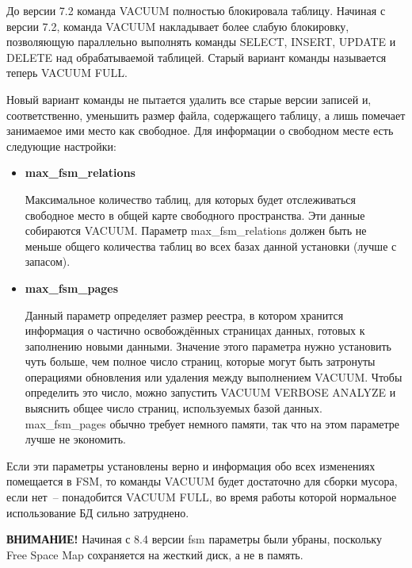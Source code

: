 До версии 7.2 команда VACUUM полностью блокировала таблицу. Начиная с версии 7.2, команда VACUUM накладывает более слабую
блокировку, позволяющую параллельно выполнять команды SELECT, INSERT, UPDATE и DELETE над обрабатываемой таблицей.
Старый вариант команды называется теперь VACUUM FULL.

Новый вариант команды не пытается удалить все старые версии записей и, соответственно, уменьшить размер файла, содержащего таблицу,
а лишь помечает занимаемое ими место как свободное. Для информации о свободном месте есть следующие настройки:
\begin{itemize}
\item \textbf{max\_fsm\_relations}

Максимальное количество таблиц, для которых будет отслеживаться свободное место в общей карте свободного пространства.
Эти данные собираются VACUUM. Параметр max\_fsm\_relations должен быть не меньше общего количества таблиц во всех
базах данной установки (лучше с запасом).

\item \textbf{max\_fsm\_pages}

Данный параметр определяет размер реестра, в котором хранится информация о частично освобождённых страницах данных,
готовых к заполнению новыми данными. Значение этого параметра нужно установить чуть больше, чем полное число страниц,
которые могут быть затронуты
операциями обновления или удаления между выполнением VACUUM. Чтобы определить это число, можно запустить VACUUM VERBOSE ANALYZE
и выяснить общее число страниц, используемых базой данных. max\_fsm\_pages обычно требует немного памяти, так что на этом
параметре лучше не экономить.
\end{itemize}

Если эти параметры установлены верно и информация обо всех изменениях помещается в FSM,
то команды VACUUM будет достаточно для сборки мусора, если нет~-- понадобится
VACUUM FULL, во время работы которой нормальное использование БД сильно затруднено.

\textbf{ВНИМАНИЕ!} Начиная с 8.4 версии fsm параметры были убраны, поскольку Free Space Map сохраняется на жесткий диск, а не в память.

